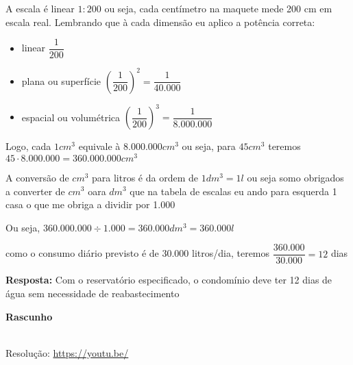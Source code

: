 A escala é linear $ 1:200 $  ou seja, cada centímetro na maquete mede 200 cm em escala real.
Lembrando que à cada dimensão eu aplico a potência correta:
\begin{itemize}
    \item linear $ \dfrac{1}{200} $
    \item plana ou superfície $ \left( \dfrac{1}{200} \right)^{2} = \dfrac{1}{40.000}  $
    \item espacial ou volumétrica $ \left( \dfrac{1}{200} \right)^{3} = \dfrac{1}{8.000.000}  $
\end{itemize}

Logo, cada $ 1 cm^3 $ equivale à $ 8.000.000 cm^3 $ ou seja, para $ 45 cm^{3}  $ teremos $ 45 \cdot 8.000.000 = 360.000.000 cm^3 $

A conversão de $ cm^3 $ para litros é da ordem de $ 1 dm^3 = 1 l $ ou seja somo obrigados a converter de $ cm^3 $ oara $ dm^3 $ que na tabela de escalas eu ando para esquerda 1 casa o que me obriga a dividir por 1.000

Ou seja, $ 360.000.000 \div 1.000 = 360.000 dm^3 = 360.000 l $

como o consumo diário previsto é de 30.000 litros/dia, teremos $ \dfrac{360.000}{30.000} = 12 $ dias

\textbf{Resposta:} Com o reservatório especificado, o condomínio deve ter 12 dias de água sem necessidade de reabastecimento

\textbf{Rascunho}

\noindent {}




\begin{center}
    \href{https://youtu.be/}{
    }\\
    Resolução: \url{https://youtu.be/}
\end{center}
